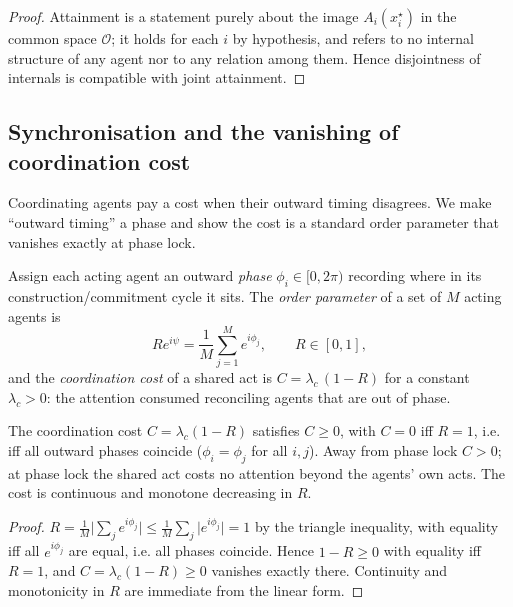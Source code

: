\documentclass[11pt,twocolumn,a4paper]{article}
\newcommand{\Purp}{x^{\star}}        %
\newcommand{\Ord}{R}                 %
\newcommand{\phase}{\phi}
\newcommand{\Out}{\mathcal{O}}       %
\newcommand{\abs}[1]{\lvert#1\rvert}
\begin{document}
\begin{proof}
Attainment is a statement purely about the image $A_i(\Purp_i)$ in the
common space $\Out$; it holds for each $i$ by hypothesis, and refers to no
internal structure of any agent nor to any relation among them. Hence
disjointness of internals is compatible with joint attainment.
\end{proof}

\subsection{Synchronisation and the vanishing of coordination cost}

Coordinating agents pay a cost when their outward timing disagrees. We
make ``outward timing'' a phase and show the cost is a standard order
parameter that vanishes exactly at phase lock.

\begin{definition}
\label{def:orderparam}
Assign each acting agent an outward \emph{phase} $\phase_i\in[0,2\pi)$
recording where in its construction/commitment cycle it sits. The
\emph{order parameter} of a set of $M$ acting agents is
\[
\Ord e^{i\psi}=\frac1M\sum_{j=1}^M e^{i\phase_j},\qquad \Ord\in[0,1],
\]
and the \emph{coordination cost} of a shared act is
$C=\lambda_c\,(1-\Ord)$ for a constant $\lambda_c>0$: the attention
consumed reconciling agents that are out of phase.
\end{definition}

\begin{theorem}
\label{thm:phaselock}
The coordination cost $C=\lambda_c(1-\Ord)$ satisfies $C\ge0$, with
$C=0$ iff $\Ord=1$, i.e. iff all outward phases coincide
($\phase_i=\phase_j$ for all $i,j$). Away from phase lock $C>0$; at phase
lock the shared act costs no attention beyond the agents' own acts. The
cost is continuous and monotone decreasing in $\Ord$.
\end{theorem}

\begin{proof}
$\Ord=\frac1M\abs{\sum_j e^{i\phase_j}}\le\frac1M\sum_j\abs{e^{i\phase_j}}
=1$ by the triangle inequality, with equality iff all $e^{i\phase_j}$ are
equal, i.e. all phases coincide. Hence $1-\Ord\ge0$ with equality iff
$\Ord=1$, and $C=\lambda_c(1-\Ord)\ge0$ vanishes exactly there.
Continuity and monotonicity in $\Ord$ are immediate from the linear form.
\end{proof}
\end{document}
